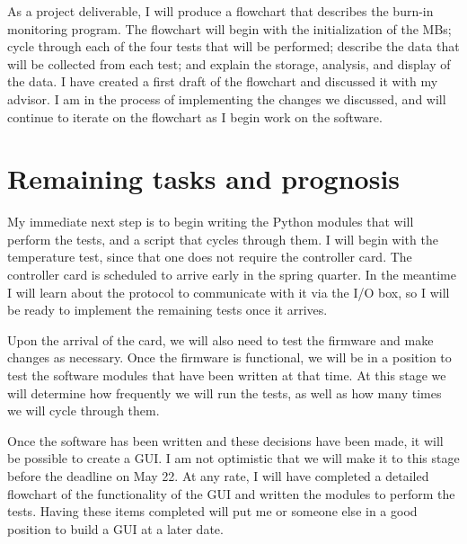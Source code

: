 \documentclass[11pt]{article}
\begin{document}
As a project deliverable, I will produce a flowchart that describes the burn-in monitoring program.  The flowchart will begin with the initialization of the MBs; cycle through each of the four tests that will be performed; describe the data that will be collected from each test; and explain the storage, analysis, and display of the data.  I have created a first draft of the flowchart and discussed it with my advisor.  I am in the process of implementing the changes we discussed, and will continue to iterate on the flowchart as I begin work on the software.



\section{Remaining tasks and prognosis}

My immediate next step is to begin writing the Python modules that will perform the tests, and a script that cycles through them.  I will begin with the temperature test, since that one does not require the controller card.  The controller card is scheduled to arrive early in the spring quarter.  In the meantime I will learn about the protocol to communicate with it via the I/O box, so I will be ready to implement the remaining tests once it arrives.

Upon the arrival of the card, we will also need to test the firmware and make changes as necessary.  Once the firmware is functional, we will be in a position to test the software modules that have been written at that time.  At this stage we will determine how frequently we will run the tests, as well as how many times we will cycle through them.

Once the software has been written and these decisions have been made, it will be possible to create a GUI.  I am not optimistic that we will make it to this stage before the deadline on May 22.  At any rate, I will have completed a detailed flowchart of the functionality of the GUI and written the modules to perform the tests.  Having these items completed will put me or someone else in a good position to build a GUI at a later date.
\end{document}
